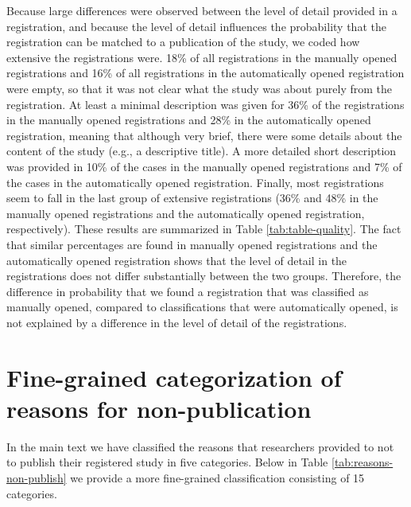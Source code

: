 \documentclass[
  ,jou, a4paper,floatsintext]{apa6}
\begin{document}
Because large differences were observed between the level of detail provided in a registration, and because the level of detail influences the probability that the registration can be matched to a publication of the study, we coded how extensive the registrations were. 18\% of all registrations in the manually opened registrations and 16\% of all registrations in the automatically opened registration were empty, so that it was not clear what the study was about purely from the registration. At least a minimal description was given for 36\% of the registrations in the manually opened registrations and 28\% in the automatically opened registration, meaning that although very brief, there were some details about the content of the study (e.g., a descriptive title). A more detailed short description was provided in 10\% of the cases in the manually opened registrations and 7\% of the cases in the automatically opened registration. Finally, most registrations seem to fall in the last group of extensive registrations (36\% and 48\% in the manually opened registrations and the automatically opened registration, respectively). These results are summarized in Table \ref{tab:table-quality}. The fact that similar percentages are found in manually opened registrations and the automatically opened registration shows that the level of detail in the registrations does not differ substantially between the two groups. Therefore, the difference in probability that we found a registration that was classified as manually opened, compared to classifications that were automatically opened, is not explained by a difference in the level of detail of the registrations.

\hypertarget{fine-grained-categorization-of-reasons-for-non-publication}{%
\section{Fine-grained categorization of reasons for non-publication}\label{fine-grained-categorization-of-reasons-for-non-publication}}

In the main text we have classified the reasons that researchers provided to not to publish their registered study in five categories. Below in Table \ref{tab:reasons-non-publish} we provide a more fine-grained classification consisting of 15 categories.
\end{document}

